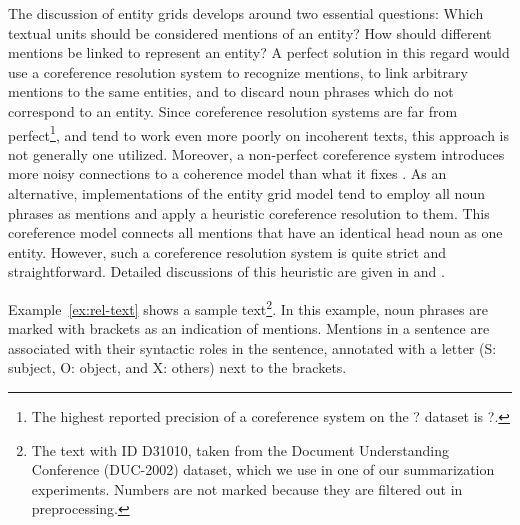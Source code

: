 The discussion of entity grids develops around two essential questions: Which textual units should be considered mentions of an entity? How should different mentions be linked to represent an entity? 
A perfect solution in this regard would use a coreference resolution system to recognize mentions, to link arbitrary mentions to the same entities, and to discard noun phrases which do not correspond to an entity. 
Since coreference resolution systems are far from perfect\footnote{The highest reported precision of a coreference system on the ? dataset is ?.}, and tend to work even more poorly on incoherent texts, this approach is not generally one utilized.  
Moreover, a non-perfect coreference system introduces more noisy connections to a coherence model than what it fixes \cite{barzilay08}.  
As an alternative, implementations of the entity grid model tend to employ all noun phrases as mentions and apply a heuristic coreference resolution to them.  
This coreference model connects all mentions that have an identical head noun as one entity. 
However, such a coreference resolution system is quite strict and straightforward. 
Detailed discussions of this heuristic are given in  and . 

Example~\ref{ex:rel-text} shows a sample text\footnote{The text with ID D31010, taken from the Document Understanding Conference (DUC-2002) dataset, which we use in one of our summarization experiments. Numbers are not marked because they are filtered out in preprocessing.}.  
In this example, noun phrases are marked with brackets as an indication of mentions. 
Mentions in a sentence are associated with their syntactic roles in the sentence, annotated with a letter (S: subject, O: object, and X: others) next to the brackets. 

